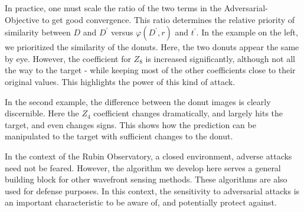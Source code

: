 In practice, one must scale the ratio of the two terms in the Adversarial-Objective to get good convergence. This ratio determines the relative priority of similarity between $D$ and $D^\prime$ versus $\varphi(D^\prime, r)$ and $t^\prime$. In the example on the left, we prioritized the similarity of the donuts. Here, the two donuts appear the same by eye. However, the coefficient for $Z_8$ is increased significantly, although not all the way to the target - while keeping most of the other coefficients close to their original values. This highlights the power of this kind of attack.

In the second example, the difference between the donut images is clearly discernible. Here the $Z_4$ coefficient changes dramatically, and largely hits the target, and even changes signs. This shows how the prediction can be manipulated to the target with sufficient changes to the donut. 

In the context of the Rubin Observatory, a closed environment, adverse attacks need not be feared. However, the algorithm we develop here serves a general building block for other wavefront sensing methods. These algorithms are also used for defense purposes. In this context, the sensitivity to adversarial attacks is an important characteristic to be aware of, and potentially protect against.

